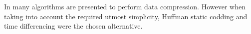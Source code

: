 In \citet{b_textcompression} many algorithms are presented to perform data compression. However when taking into account the required utmost simplicity, Huffman static codding and time differencing were the chosen alternative.


%
%
%
%
%
%
%
